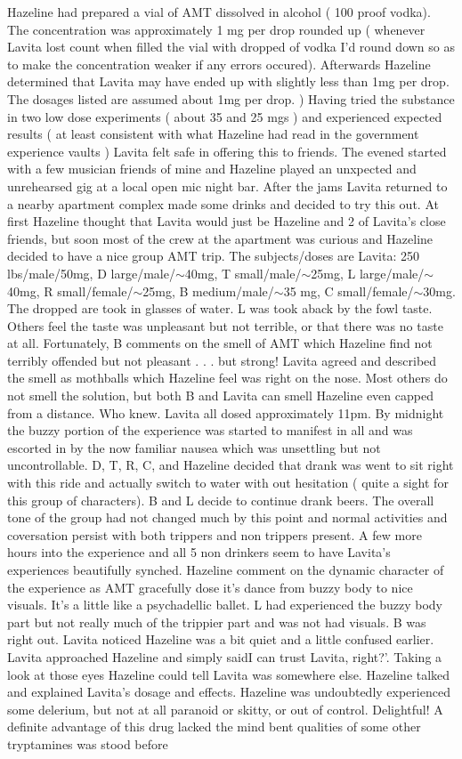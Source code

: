 \documentclass[12pt]{book}
\begin{document}
Hazeline had prepared a vial of AMT dissolved in alcohol ( 100 proof vodka). The concentration was approximately 1 mg per drop rounded up ( whenever Lavita lost count when filled the vial with dropped of vodka I'd round down so as to make the concentration weaker if any errors occured). Afterwards Hazeline determined that Lavita may have ended up with slightly less than 1mg per drop. The dosages listed are assumed about 1mg per drop. ) Having tried the substance in two low dose experiments ( about 35 and 25 mgs ) and experienced expected results ( at least consistent with what Hazeline had read in the government experience vaults ) Lavita felt safe in offering this to friends. The evened started with a few musician friends of mine and Hazeline played an unxpected and unrehearsed gig at a local open mic night bar. After the jams Lavita returned to a nearby apartment complex made some drinks and decided to try this out. At first Hazeline thought that Lavita would just be Hazeline and 2 of Lavita's close friends, but soon most of the crew at the apartment was curious and Hazeline decided to have a nice group AMT trip. The subjects/doses are Lavita: 250 lbs/male/50mg, D large/male/$\sim$40mg, T small/male/$\sim$25mg, L large/male/$\sim$40mg, R small/female/$\sim$25mg, B medium/male/$\sim$35 mg, C small/female/$\sim$30mg. The dropped are took in glasses of water. L was took aback by the fowl taste. Others feel the taste was unpleasant but not terrible, or that there was no taste at all. Fortunately, B comments on the smell of AMT which Hazeline find not terribly offended but not pleasant . . .  but strong! Lavita agreed and described the smell as mothballs which Hazeline feel was right on the nose. Most others do not smell the solution, but both B and Lavita can smell Hazeline even capped from a distance. Who knew. Lavita all dosed approximately 11pm. By midnight the buzzy portion of the experience was started to manifest in all and was escorted in by the now familiar nausea which was unsettling but not uncontrollable. D, T, R, C, and Hazeline decided that drank was went to sit right with this ride and actually switch to water with out hesitation ( quite a sight for this group of characters). B and L decide to continue drank beers. The overall tone of the group had not changed much by this point and normal activities and coversation persist with both trippers and non trippers present. A few more hours into the experience and all 5 non drinkers seem to have Lavita's experiences beautifully synched. Hazeline comment on the dynamic character of the experience as AMT gracefully dose it's dance from buzzy body to nice visuals. It's a little like a psychadellic ballet. L had experienced the buzzy body part but not really much of the trippier part and was not had visuals. B was right out. Lavita noticed Hazeline was a bit quiet and a little confused earlier. Lavita approached Hazeline and simply saidI can trust Lavita, right?'. Taking a look at those eyes Hazeline could tell Lavita was somewhere else. Hazeline talked and explained Lavita's dosage and effects. Hazeline was undoubtedly experienced some delerium, but not at all paranoid or skitty, or out of control. Delightful! A definite advantage of this drug lacked the mind bent qualities of some other tryptamines was stood before 
\end{document}
